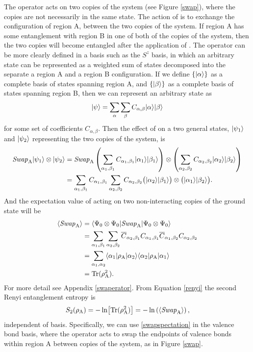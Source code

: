 The \swa operator acts on two copies of the system (see Figure \ref{swap}), where the copies are not necessarily in the same state.  The action of \swa is to exchange the configuration of region A, between the two copies of the system.  If region A has some entanglement with region B in one of both of the copies of the system, then the two copies will become entangled after the application of \swA.
The \swa operator can be more clearly defined in a basis such as the $S^z$ basis, in which an arbitrary state can be represented as a weighted sum of states decomposed into the separate a region A and a region B configuration.  
If we define $\{\lvert {\alpha} \rangle\}$ as a complete basis of states spanning region A, and $\{\lvert {\beta} \rangle\}$ as a complete basis of states spanning region B, then we can represent an arbitrary state as
\begin{equation}
	\lvert {\psi} \rangle = \sum_{\alpha}\sum_{\beta} C_{\alpha,\beta}\lvert {\alpha} \rangle\lvert {\beta} \rangle
\end{equation}
for some set of coefficients $C_{\alpha,\beta}$.  
Then the effect of \swa on a two general states, $\lvert {\psi_1} \rangle$ and $\lvert {\psi_2} \rangle$ representing the two copies of the system, is
\begin{align}
	{\it Swap}_{\rm A} \lvert {\psi_1} \rangle \otimes \lvert {\psi_2} \rangle  &= 
		{\it Swap}_{\rm A} \left(\sum_{\alpha_1,\beta_1} 
		C_{\alpha_1,\beta_1}\lvert {\alpha_1} \rangle\lvert {\beta_1} \rangle\right) \otimes
			\left(\sum_{\alpha_2,\beta_2} 
		C_{\alpha_2,\beta_2}\lvert {\alpha_2} \rangle\lvert {\beta_2} \rangle\right) \\
			&=\sum_{\alpha_1,\beta_1}C_{\alpha_1,\beta_1}\sum_{\alpha_2,\beta_2} 
			C_{\alpha_2,\beta_2}
			\big(\lvert {\alpha_2} \rangle\lvert {\beta_1} \rangle\big)\otimes\big(\lvert {\alpha_1} \rangle\lvert {\beta_2} \rangle\big).
\end{align}
And the expectation value of \swa acting on two non-interacting copies of the ground state will be
\begin{align}
\langle {\it Swap}_{\rm A} \rangle &=
\langle {\Psi_0\otimes\Psi_0} \rvert{\it Swap}_{\rm A} \lvert {\Psi_0\otimes\Psi_0} \rangle \\ 
	&=\sum_{\alpha_1,\beta_1} \sum_{\alpha_2,\beta_2}
		\overline{C}_{\alpha_2,\beta_1}C_{\alpha_1,\beta_1}
		\overline{C}_{\alpha_1,\beta_2}C_{\alpha_2,\beta_2}\\
	&=\sum_{\alpha_1,\alpha_2} \langle {\alpha_1} \rvert\rho_{\rm A} \lvert {\alpha_2} \rangle 
					\langle {\alpha_2} \rvert\rho_{\rm A} \lvert {\alpha_1} \rangle\\
	&={\rm Tr (\rho_A^2)}.
\end{align}
For more detail see Appendix \ref{swaperator}.  From Equation \eqref{renyi} the second Renyi entanglement entropy is
\begin{equation}
	S_2(\rho_{\rm A}) = -\ln\!\left[{\rm Tr}(\rho_{\rm A}^2)\right] = -\ln\left( \langle {\it Swap}_{\rm A} \rangle \right), \label{swapspectation}
\end{equation}
independent of basis.  Specifically, we can use \eqref{swapspectation} in the valence bond basis, where the \swa operator acts to swap the endpoints of valence bonds within region A between copies of the system, as in Figure \ref{swap}.

